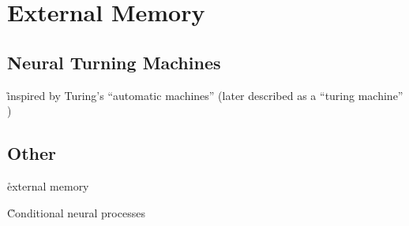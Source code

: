 \chapter{External Memory}


\section{Neural Turning Machines}



\r{inspired by Turing's ``automatic machines''  \cite{turing1936computable} (later described as a ``turing machine'' \cite{church1937turing})}




\section{Other}


\r{external memory \cite{santoro2016meta}}


\r{Conditional neural processes \cite{garnelo2018conditional}}